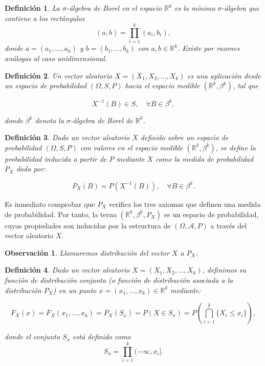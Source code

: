 \documentclass{report}
\newtheorem{dfn}{Definición}[section]
\newtheorem{obs}{Observación}[section]
\begin{document}
\begin{dfn}
La \emph{$\sigma$-álgebra de Borel} en el espacio \( \mathbb{R}^k \) es la mínima $\sigma$-álgebra que contiene a los rectángulos
\[
(a, b) = \prod_{i=1}^{k} (a_i, b_i),
\]
donde \( a = (a_1, \dots, a_k) \) y \( b = (b_1, \dots, b_k) \) con \( a, b \in \mathbb{R}^k \). Existe por razones análogas
al caso unidimensional.
\end{dfn}


\begin{dfn}
Un \emph{vector aleatorio} \( X = (X_1, X_2, \dots, X_k) \) es una aplicación desde un espacio de probabilidad \( (\Omega, S, P) \) 
hacia el espacio medible \( (\mathbb{R}^k, \beta^k) \), tal que

\[
X^{-1}(B) \in S, \quad \forall B \in \beta^k,
\]

donde \( \beta^k \) denota la \(\sigma\)-álgebra de Borel de \( \mathbb{R}^k \).
\end{dfn}

\begin{dfn}
Dado un vector aleatorio \( X \) definido sobre un espacio de probabilidad \( (\Omega, S, P) \) 
con valores en el espacio medible \( (\mathbb{R}^k, \beta^k) \), se define la \emph{probabilidad inducida} 
a partir de \( P \) mediante \( X \) como la medida de probabilidad \( P_X \) dada por:

\begin{equation}
P_X(B) = P(X^{-1}(B)), \quad \forall B \in \beta^k. \tag{3.1}
\end{equation}
\end{dfn}


Es inmediato comprobar que \( P_X \) verifica los tres axiomas que definen una medida de probabilidad. Por tanto, 
la terna \( (\mathbb{R}^k, \beta^k, P_X) \) es un espacio de probabilidad, cuyas propiedades son inducidas 
por la estructura de \( (\Omega, \mathcal{A}, P) \) a través del vector aleatorio \( X \).

\begin{obs}
    Llamaremos \emph{distribución} del vector \( X \) a \( P_X \).
\end{obs}

\begin{dfn}
Dado un vector aleatorio \( X = (X_1, X_2, \dots, X_k) \), definimos su \textit{función de distribución conjunta}
 (o \textit{función de distribución asociada} a la distribución \( P_X \)) en un punto \( x = (x_1, \dots, x_k) \in \mathbb{R}^k \) mediante:

\begin{equation*}
F_X(x) = F_X(x_1, \dots, x_k) = P_X(S_x) = P(X \in S_x) = P\left( \bigcap_{i=1}^{k} \{ X_i \leq x_i \} \right),
\end{equation*}

donde el conjunto \( S_x \) está definido como
\[
S_x = \prod_{i=1}^{k} (-\infty, x_i].
\]
\end{dfn}
\end{document}
